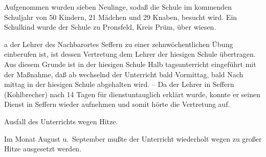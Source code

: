 

\pstart
Aufgenommen wurden sieben Neulinge, sodaß\ob
die Schule im kommenden Schuljahr von 50\ob
Kindern, 21 Mädchen und 29 Knaben,\ob
besucht wird. Ein Schulkind wurde der\ob
Schule zu Pronsfeld, Kreis Prüm, über\ohb
wiesen.

\pend
{}
\pstart

%
a der Lehrer des Nachbarortes Seffern zu einer\ob
zehnwöchentlichen Übung einberufen ist, ist dessen\ob
Vertretung dem Lehrer der hiesigen Schule übertragen.\ob
Aus diesem Grunde ist in der hiesigen Schule Halb\ohb
tagsunterricht eingeführt mit der Maßnahme, daß ab\ohb
wechselnd der Unterricht bald Vormittag, bald Nach\ohb
mittag in der hiesigen Schule abgehalten wird. –\ob
Da der Lehrer in Seffern (Kohlbrecher) nach 14\ob
Tagen für dienstuntauglich erklärt wurde,\ob
konnte er seinen Dienst in Seffern wieder\ob
aufnehmen und somit hörte die Vertretung\ob
auf.

Ausfall des Unterrichts wegen Hitze.

Im Monat August u.\ September mußte der\ob
Unterricht wiederholt wegen zu großer Hitze\ob
ausgesetzt werden.
\pend
